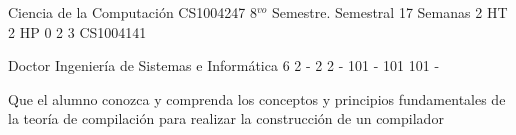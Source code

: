 \documentclass[a4paper,8pt]{article}
\begin{document}
\setNombreProfesor{}
\setGradoProfesorAbreviado{}
\sylabusHeader

\academicaTable
{Ciencia de la Computación} %
{CS1004247} %
{8$^{vo}$ Semestre.} %
{Semestral} %
{17 Semanas} %
{2 HT} %
{2 HP} %
{0} %
{}  %
{2} %
{3} %
{CS1004141} %

\administrativaTable
{Doctor} %
{Ingeniería de Sistemas e Informática} %
{6} %
{2} %
{-} %
{2} %
{2} %
{-} %
{101} %
{-} %
{101} %
{101} %
{-} %


\begin{fundamentacion}
Que el alumno conozca y comprenda los conceptos y principios fundamentales de la teoría de compilación para realizar la construcción de un compilador

\end{fundamentacion}

\begin{sumilla}
\item \PLProgramRepresentation
\item \PLLanguageTranslationandExecution
\item \PLSyntaxAnalysis
\item \PLCompilerSemanticAnalysis
\item \PLCodeGeneration

\end{sumilla}

\begin{competenciasAsignatura}
\item {}
\item {}

\end{competenciasAsignatura}
\end{document}
